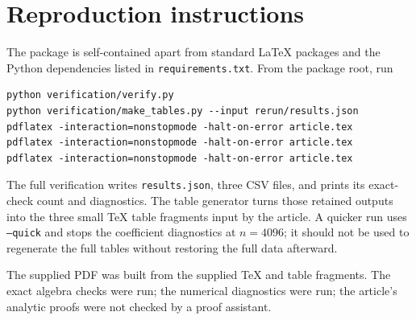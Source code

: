 \documentclass[11pt,a4paper]{article}
\numberwithin{equation}{section}
\theoremstyle{definition}\newtheorem{definition}[theorem]{Definition}
\theoremstyle{remark}\newtheorem{remark}[theorem]{Remark}
\theoremstyle{definition}
\begin{document}
\section{Reproduction instructions}
\label{app:reproduce}
The package is self-contained apart from standard LaTeX packages and the
Python dependencies listed in \texttt{requirements.txt}. From the package
root, run
\begin{verbatim}
python verification/verify.py
python verification/make_tables.py --input rerun/results.json
pdflatex -interaction=nonstopmode -halt-on-error article.tex
pdflatex -interaction=nonstopmode -halt-on-error article.tex
pdflatex -interaction=nonstopmode -halt-on-error article.tex
\end{verbatim}
The full verification writes \texttt{results.json}, three CSV files, and
prints its exact-check count and diagnostics. The table generator turns
those retained outputs into the three small TeX table fragments input by
the article. A quicker run uses \texttt{--quick} and stops the coefficient
diagnostics at $n=4096$; it should not be used to regenerate the full tables
without restoring the full data afterward.

The supplied PDF was built from the supplied TeX and table fragments.
The exact algebra checks were run; the numerical diagnostics were run;
the article's analytic proofs were not checked by a proof assistant.
\end{document}
